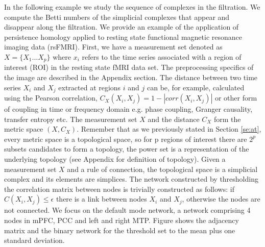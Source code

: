 \documentclass[onecollarge,runningheads]{svjour2}
\begin{document}

In the following example we study the sequence of complexes in the filtration. We compute the Betti numbers of the simplicial complexes that appear and disappear along the filtration.
We provide an example of the application of persistence homology applied to resting state functional magnetic resonance imaging data (rsFMRI). First, we have a measurement set denoted as $X= \{X_1 ... X_p\}$ where $x_i$ refers to the time series associated with a region of interest (ROI) in the resting state fMRI data set. The preprocessing specifics of the image are described in the Appendix section. 
The distance between two time series $X_i$ and $X_j$ extracted at regions $i$ and $j$ can be, for example, calculated using the Pearson correlation, $C_{X}(X_i ,X_j)= 1 - |corr(X_i,X_j)|$ or other form of coupling in time or frequency domain e.g. phase coupling, Granger causality, transfer entropy etc.
The measurement set $X$ and the distance $C_X$ form the metric space $(X,C_X)$. Remember that as
we previously stated in Section \ref{se:at}, every metric space is a topological space, so for p regions of interest there are $2^p$ subsets candidates to form a topology, the power set is a representation of the underlying topology (see Appendix for definition of topology). Given a measurement set $X$ and a rule of connection, the topological space is a simplicial complex and its elements are simplices.
The network constructed by thresholding the correlation matrix between nodes is trivially constructed as follows: if $C(X_i,X_j) \leq \epsilon$ there is a link between nodes $X_i$ and $X_j$, otherwise the nodes are not connected. We focus on the default mode network, a network comprising 4 nodes in mPFC, PCC and left and right MTP.
Figure \cite{adjmatrix} shows the adjacency matrix and the binary network for the threshold set to the mean plus one standard deviation. 
\end{document}
